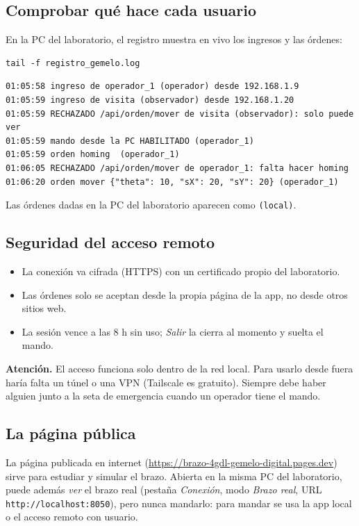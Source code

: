 \documentclass[a4paper,11pt]{article}
\newcommand{\codigo}[1]{\texttt{#1}}
\newcommand{\aviso}[1]{\par\smallskip\noindent\colorbox{rojo!10}{\parbox{\dimexpr\linewidth-2\fboxsep}{\textbf{\color{rojo}Atención.} #1}}\par\smallskip}
\begin{document}
\subsection{Comprobar qué hace cada usuario}
En la PC del laboratorio, el registro muestra en vivo los ingresos y las órdenes:
\begin{lstlisting}
tail -f registro_gemelo.log
\end{lstlisting}
\begin{lstlisting}
01:05:58 ingreso de operador_1 (operador) desde 192.168.1.9
01:05:59 ingreso de visita (observador) desde 192.168.1.20
01:05:59 RECHAZADO /api/orden/mover de visita (observador): solo puede ver
01:05:59 mando desde la PC HABILITADO (operador_1)
01:05:59 orden homing  (operador_1)
01:06:05 RECHAZADO /api/orden/mover de operador_1: falta hacer homing
01:06:20 orden mover {"theta": 10, "sX": 20, "sY": 20} (operador_1)
\end{lstlisting}
Las órdenes dadas en la PC del laboratorio aparecen como \codigo{(local)}.

\subsection{Seguridad del acceso remoto}
\begin{itemize}
\item La conexión va cifrada (HTTPS) con un certificado propio del laboratorio.
\item Las órdenes solo se aceptan desde la propia página de la app, no desde otros sitios web.
\item La sesión vence a las 8 h sin uso; \emph{Salir} la cierra al momento y suelta el mando.
\end{itemize}
\aviso{El acceso funciona solo dentro de la red local. Para usarlo desde fuera haría falta un túnel o una VPN (Tailscale es gratuito). Siempre debe haber alguien junto a la seta de emergencia cuando un operador tiene el mando.}

\subsection{La página pública}
La página publicada en internet (\url{https://brazo-4gdl-gemelo-digital.pages.dev}) sirve para estudiar y simular el brazo. Abierta en la misma PC del laboratorio, puede además \emph{ver} el brazo real (pestaña \emph{Conexión}, modo \emph{Brazo real}, URL \codigo{http://localhost:8050}), pero nunca mandarlo: para mandar se usa la app local o el acceso remoto con usuario.
\end{document}
